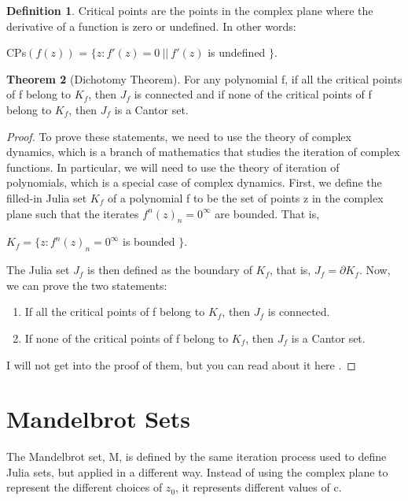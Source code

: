 \documentclass[a4paper,11pt]{article}
\theoremstyle{definition}
\newtheorem{defn}{Definition}[section] %
\newtheorem{theorem}[defn]{Theorem} %
\numberwithin{equation}{section} %
\begin{document}
\begin{defn}
    Critical points are the points in the complex plane where the derivative of a function is zero or undefined. In other words:
    \begin{center}
        CPs$( f(z) )$ = $\{ z : f'(z) = 0~||~f'(z) $ is undefined $ \}$.
    \end{center}
    
\end{defn}

\begin{theorem}[Dichotomy Theorem]
    For any polynomial f, if all the critical points of f belong to $K_f$, then $J_f$ is connected and if none of the critical points of f belong to $K_f$, then $J_f$ is a Cantor set.
\end{theorem}
\begin{proof}
    To prove these statements, we need to use the theory of complex dynamics, which is a branch of mathematics that studies the iteration of complex functions. In particular, we will need to use the theory of iteration of polynomials, which is a special case of complex dynamics.
    First, we define the filled-in Julia set $K_f$ of a polynomial f to be the set of points z in the complex plane such that the iterates ${f^n(z)}_n = 0^{\infty}$ are bounded. That is,
    \begin{center}
        $K_f = \{ z : {f^n(z)}_n = 0^{\infty} $ is bounded $ \}$.
    \end{center}
    The Julia set $J_f$ is then defined as the boundary of $K_f$, that is, $J_f = \partial K_f$.
    Now, we can prove the two statements:
    \begin{enumerate}
        \item If all the critical points of f belong to $K_f$, then $J_f$ is connected.
        \item If none of the critical points of f belong to $K_f$, then $J_f$ is a Cantor set.
    \end{enumerate}
    I will not get into the proof of them, but you can read about it here \cite{dichotomy}.

\end{proof}


\section{Mandelbrot Sets}

The Mandelbrot set, M, is defined by the same iteration process used to define Julia sets, but applied in a different way. Instead of using the complex plane to represent the different choices of $z_0$, it represents different values of c.
\end{document}
